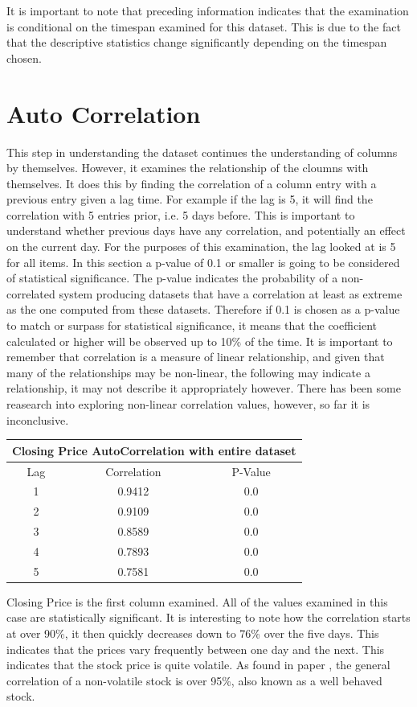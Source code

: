 It is important to note that preceding information indicates that the examination is conditional on the timespan examined for this dataset. This is due to the fact that the descriptive statistics change significantly depending on the timespan chosen.

\section{Auto Correlation}

This step in understanding the dataset continues the understanding of columns by themselves. However, it examines the relationship of the cloumns with themselves. It does this by finding the correlation of a column entry with a previous entry given a lag time. For example if the lag is 5, it will find the correlation with 5 entries prior, i.e. 5 days before. This is important to understand whether previous days have any correlation, and potentially an effect on the current day. For the purposes of this examination, the lag looked at is 5 for all items. In this section a p-value of 0.1 or smaller is going to be considered of statistical significance. The p-value indicates the probability of a non-correlated system producing datasets that have a correlation at least as extreme as the one computed from these datasets. Therefore if 0.1 is chosen as a p-value to match or surpass for statistical significance, it means that the coefficient calculated or higher will be observed up to 10\% of the time. It is important to remember that correlation is a measure of linear relationship, and given that many of the relationships may be non-linear, the following may indicate a relationship, it may not describe it appropriately however. There has been some reasearch into exploring non-linear correlation values, however, so far it is inconclusive.

\begin{center}
\begin{tabular}{ c c c } 
\hline
\multicolumn{3}{|c|}{Closing Price AutoCorrelation with entire dataset} \\
\hline
Lag & Correlation & P-Value \\
\hline
1 & 0.9412 & 0.0 \\
2 & 0.9109 & 0.0 \\
3 & 0.8589 & 0.0 \\
4 & 0.7893 & 0.0 \\
5 & 0.7581 & 0.0 \\
\end{tabular}
\end{center}
Closing Price is the first column examined. All of the values examined in this case are statistically significant. It is interesting to note how the correlation starts at over 90\%, it then quickly decreases down to 76\% over the five days. This indicates that the prices vary frequently between one day and the next. This indicates that the stock price is quite volatile. As found in paper \cite{correlationVvolatility}, the general correlation of a non-volatile stock is over 95\%, also known as a well behaved stock.

